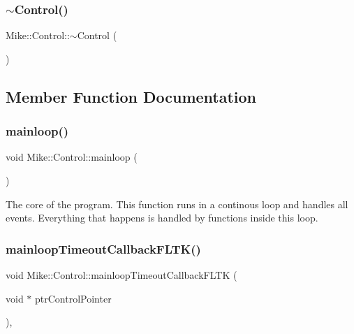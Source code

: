 \mbox{\label{class_mike_1_1_control_aa3395e0509ab5b980732ab0e3a29ce4d}} 
\subsubsection{\texorpdfstring{$\sim$\+Control()}{~Control()}}
{\footnotesize\ttfamily Mike\+::\+Control\+::$\sim$\+Control (\begin{DoxyParamCaption}{ }\end{DoxyParamCaption})}



\subsection{Member Function Documentation}
\mbox{\label{class_mike_1_1_control_a3440083f03f7da3d4490fa44bc13d62b}} 
\subsubsection{\texorpdfstring{mainloop()}{mainloop()}}
{\footnotesize\ttfamily void Mike\+::\+Control\+::mainloop (\begin{DoxyParamCaption}{ }\end{DoxyParamCaption})\hspace{0.3cm}{\ttfamily [private]}}

The core of the program. This function runs in a continous loop and handles all events. Everything that happens is handled by functions inside this loop. \mbox{\label{class_mike_1_1_control_ac627d3cc73f39181fbfabfa01eb47f85}} 
\subsubsection{\texorpdfstring{mainloop\+Timeout\+Callback\+F\+L\+T\+K()}{mainloopTimeoutCallbackFLTK()}}
{\footnotesize\ttfamily void Mike\+::\+Control\+::mainloop\+Timeout\+Callback\+F\+L\+TK (\begin{DoxyParamCaption}\item[{void $\ast$}]{ptr\+Control\+Pointer }\end{DoxyParamCaption})\hspace{0.3cm}{\ttfamily [static]}, {\ttfamily [private]}}

